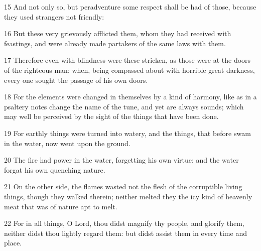 \par 15 And not only so, but peradventure some respect shall be had of those, because they used strangers not friendly:
\par 16 But these very grievously afflicted them, whom they had received with feastings, and were already made partakers of the same laws with them.
\par 17 Therefore even with blindness were these stricken, as those were at the doors of the righteous man: when, being compassed about with horrible great darkness, every one sought the passage of his own doors.
\par 18 For the elements were changed in themselves by a kind of harmony, like as in a psaltery notes change the name of the tune, and yet are always sounds; which may well be perceived by the sight of the things that have been done.
\par 19 For earthly things were turned into watery, and the things, that before swam in the water, now went upon the ground.
\par 20 The fire had power in the water, forgetting his own virtue: and the water forgat his own quenching nature.
\par 21 On the other side, the flames wasted not the flesh of the corruptible living things, though they walked therein; neither melted they the icy kind of heavenly meat that was of nature apt to melt.
\par 22 For in all things, O Lord, thou didst magnify thy people, and glorify them, neither didst thou lightly regard them: but didst assist them in every time and place.


